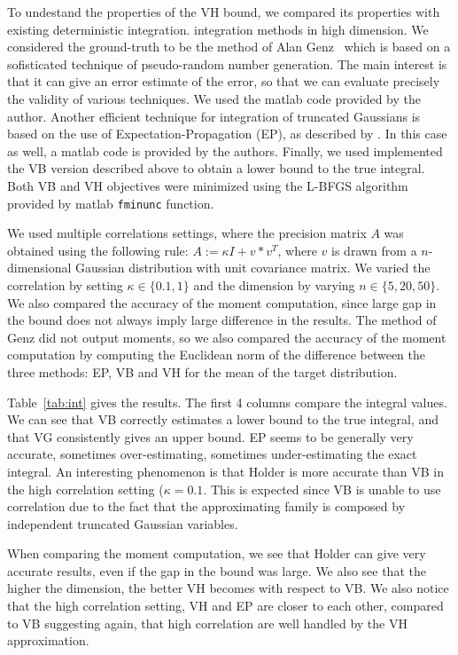 \documentclass{article} %
\begin{document}
To undestand the properties of the VH bound, we compared its properties with existing deterministic integration. integration methods in high dimension. We considered the ground-truth to be the method of Alan Genz~\citep{genz2009computation}
which is based on a sofisticated technique of pseudo-random number generation. The main interest is that it can give an error estimate of the error, so that we can evaluate precisely the validity of various techniques. We used the matlab code provided by the author.
Another efficient technique for integration of truncated Gaussians is based on the use of Expectation-Propagation (EP), as
described by \citet{Cunningham-et-al-Gaussian-EP2012}. In this case as well, a matlab code is provided by the authors. 
Finally, we used implemented the VB version described above to obtain a lower bound to the true integral. 
Both VB and VH objectives were minimized using the L-BFGS algorithm provided by matlab \texttt{fminunc} function.

We used multiple correlations settings, where the precision matrix $A$ was obtained using the following rule:
$A:=\kappa I + v*v^T $, where $v$ is drawn from a $n$-dimensional Gaussian distribution with unit covariance matrix.
We varied the correlation by setting $\kappa\in\{0.1,1\}$ and the dimension by varying $n\in\{5, 20, 50\}$.
We also compared the accuracy of the moment computation, since large gap in the bound does not always imply large difference in the results. The method of Genz did not output moments, so we also compared the accuracy of the moment computation by computing the Euclidean norm of the difference between the three methods: EP, VB and VH for the mean
of the target distribution. %

 Table~\ref{tab:int} gives the results. The first 4 columns compare the integral values. We can see that VB correctly estimates a lower bound to the true integral, and that VG consistently gives an upper bound. EP seems to be generally very accurate, sometimes over-estimating, sometimes under-estimating the exact integral. An interesting phenomenon is that Holder is more accurate than VB in the high correlation setting ($\kappa=0.1$. This is expected since VB is unable to use correlation due to the fact that the 
 approximating family is composed by independent truncated Gaussian variables.

When comparing the moment computation, we see that Holder can give very accurate results, even if the gap in the bound was large. We also see that the higher the dimension, the better VH becomes with respect to VB. We also notice that the high correlation setting, VH and EP are closer to each other, compared to VB suggesting again, that high correlation are well handled by the VH approximation. 
\end{document}
